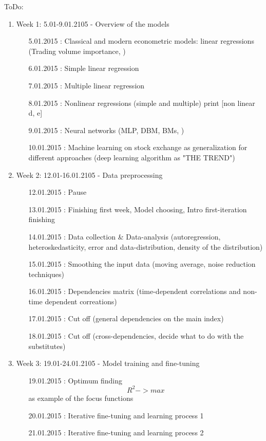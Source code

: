 \documentclass {article}
\begin{document}
ToDo:
\begin{enumerate}
	\item Week 1: 5.01-9.01.2105 - Overview of the models 
	\begin{enumerate}
		\item[5.01.2015]: Classical and modern econometric models:  linear regressions (Trading volume importance, ) 
		\item[6.01.2015]: Simple linear regression 	 		  
		\item[7.01.2015]: Multiple linear regression  
		\item[8.01.2015]: Nonlinear regressions (simple and multiple) print [non linear d, e]  
		\item[9.01.2015]: Neural networks (MLP, DBM, BMs, )
		\item[10.01.2015]: Machine learning on stock exchange as generalization for different approaches (deep learning algorithm as "THE TREND")
	\end{enumerate}
	\item Week 2: 12.01-16.01.2105 - Data preprocessing
	\begin{enumerate}
		\item[12.01.2015]: Pause
		\item[13.01.2015]: Finishing first week, Model choosing, Intro first-iteration finishing
		\item[14.01.2015]: Data collection  \& Data-analysis (autoregression, heteroskedasticity, error and data-distribution, density of the distribution)
		\item[15.01.2015]: Smoothing the input data (moving average, noise reduction techniques)
		\item[16.01.2015]: Dependencies matrix  (time-dependent correlations and non-time dependent correations)
		\item[17.01.2015]: Cut off (general dependencies on the main index)
		\item[18.01.2015]: Cut off (cross-dependencies, decide what to do with the substitutes)
	\end{enumerate}
	\item Week 3: 19.01-24.01.2105 - Model training and fine-tuning
	\begin{enumerate}
		\item[19.01.2015]: Optimum finding  \[ R^2 -> max \] as example of the focus functions
		\item[20.01.2015]: Iterative fine-tuning and learning process 1
		\item[21.01.2015]: Iterative fine-tuning and learning process 2

\end{enumerate}
\end{enumerate}
\end{document}
